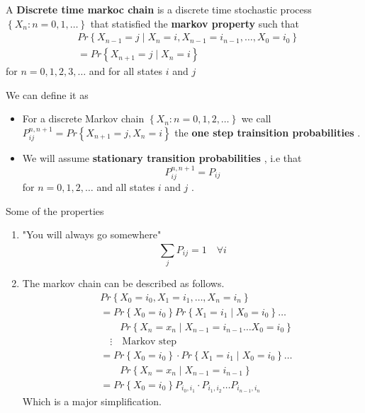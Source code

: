 \documentclass{article}
\theoremstyle{remark}
\begin{document}
\begin{definition}
  A \textbf{ Discrete time markoc chain}  is a discrete time stochastic process $\left\{ X_{n} : n = 0,1,\ldots \right\}$ that statisfied the \textbf{markov property}  such that \[
  \begin{split}
       & Pr \left \{ X_{n-1} = j  \mid  X_{n} = i ,    X_{n-1} = i_{n-1} , \ldots, X_{0} = i_{0} \right \}  \\
    &=  Pr \left \{ X_{n+1} = j  \mid  X_{n} = i \right \}
  \end{split}
  \]
  for $n = 0,1,2,3, \ldots$ and for all states $i$ and $j$
\end{definition}

\begin{definition}
  We can define it  as
  \begin{itemize}
    \item For a discrete Markov chain $\left\{ X_{n}: n= 0,1,2, \ldots \right\}$ we call $P_{ij}^{n, n+1} = Pr \left \{ X_{n+1} = j , X_{n} =i \right \} $ the \textbf{one step trainsition probabilities} .
    \item We will assume \textbf{stationary transition probabilities} , i.e that \[
    P_{ij}^{n, n+1} = P_{ij}
    \]   for $n = 0,1,2, \ldots$ and all states $i $ and $j$ .
  \end{itemize}
\end{definition}

Some of the properties
\begin{enumerate}
  \item "You will always go somewhere" \[
  \sum_{j}^{}  P_{ij} = 1 \quad  \forall i
  \]
\item The markov chain can be described as follows. \[
    \begin{split}
  & Pr \left \{ X_{0} = i_{0} , X_{1} = i_{1}, \ldots, X_{n} = i_{n} \right \}   \\
 &=  Pr \left \{ X_{0} = i_{0}  \right \}   Pr \left \{ X_{1} = i_{1}  \mid  X_{0} = i_{0} \right \}   \ldots \\
     & \quad \quad    Pr \left \{ X_{n} = x_{n}  \mid  X_{n-1} = i_{n-1} \ldots X_{0} = i_{0} \right \}  \\
  &  \quad \vdots \quad     \text{Markov step} \\
 &=  Pr \left \{ X_{0} = i_{0}  \right \}  \cdot  Pr \left \{ X_{1} = i_{1}  \mid X_{0} = i_{0} \right \} \ldots \\
  & \quad \quad    Pr \left \{ X_{n} = x_{n}  \mid  X_{n-1} = i_{n-1} \right \}   \\
 &=  Pr \left \{ X_{0} = i_{0}  \right \} P_{i_{0}, i_{1}} \cdot  P_{i_{1}, i_{2}} \ldots P_{i_{n-1}, i_{n}}
    \end{split}
\]
Which is a major simplification.
\end{enumerate}
\end{document}
